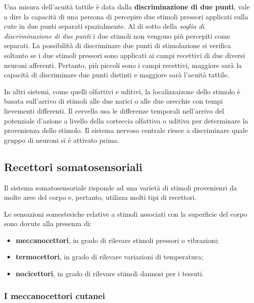 \documentclass[]{article}
\begin{document}
Una misura dell'acuità tattile è data dalla \textbf{discriminazione di
due punti}, vale a dire la capacità di una persona di percepire due
stimoli pressori applicati sulla cute in due punti separati
spazialmente. Al di sotto della \emph{soglia di discriminazione di due
punti} i due stimoli non vengono più percepiti come separati. La
possibilità di discriminare due punti di stimolazione si verifica
soltanto se i due stimoli pressori sono applicati ai campi recettivi di
due diversi neuroni afferenti. Pertanto, più piccoli sono i campi
recettivi, maggiore sarà la capacità di discriminare due punti distinti
e maggiore sarà l'acuità tattile.

In altri sistemi, come quelli olfattivi e uditivi, la localizzaizone
dello stimolo è basata sull'arrivo di stimoli alle due narici o alle due
orecchie con tempi lievementi differenti. Il cervello usa le differenze
temporali nell'arrivo del potenziale d'azione a livello della corteccia
olfattiva o uditiva per determinare la provenienza dello stimolo. Il
sistema nervoso centrale riesce a discriminare quale gruppo di neuroni
si è attivato prima.

\subsection{Recettori
somatosensoriali}\label{recettori-somatosensoriali}

Il sistema somatosensoriale risponde ad una varietà di stimoli
provenienri da molte aree del corpo e, pertanto, utilizza molti tipi di
recettori.

Le sensazioni somestesiche relative a stimoli associati con la
superficie del corpo sono dovute alla presenza di:

\begin{itemize}
\itemsep1pt\parskip0pt
\item
  \textbf{meccanocettori}, in grado di rilevare stimoli pressori o
  vibrazioni;
\item
  \textbf{termocettori}, in grado di rilevare variazioni di temperatura;
\item
  \textbf{nocicettori}, in grado di rilevare stimoli dannosi per i
  tessuti.
\end{itemize}

\subsubsection{I meccanocettori cutanei}\label{i-meccanocettori-cutanei}
\end{document}
